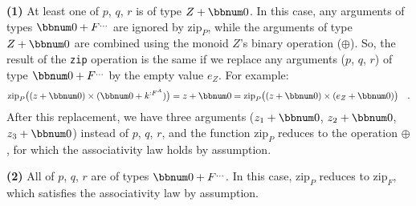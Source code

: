 \textbf{(1)} At least one of $p$, $q$, $r$ is of type $Z+\bbnum 0$.
In this case, any arguments of types $\bbnum 0+F^{...}$ are ignored
by $\text{zip}_{P}$, while the arguments of type $Z+\bbnum 0$ are
combined using the monoid $Z$\textsf{'}s binary operation ($\oplus$). So,
the result of the \lstinline!zip! operation is the same if we replace
any arguments ($p$, $q$, $r$) of type $\bbnum 0+F^{...}$ by the
empty value $e_{Z}$. For example:
\[
\text{zip}_{P}\big((z+\bbnum 0)\times(\bbnum 0+k^{:F^{A}})\big)=z+\bbnum 0=\text{zip}_{P}\big((z+\bbnum 0)\times(e_{Z}+\bbnum 0)\big)\quad.
\]
After this replacement, we have three arguments ($z_{1}+\bbnum 0$,
$z_{2}+\bbnum 0$, $z_{3}+\bbnum 0$) instead of $p$, $q$, $r$,
and the function $\text{zip}_{P}$ reduces to the operation $\oplus$,
for which the associativity law holds by assumption.

\textbf{(2)} All of $p$, $q$, $r$ are of types $\bbnum 0+F^{...}$.
In this case, $\text{zip}_{P}$ reduces to $\text{zip}_{F}$, which
satisfies the associativity law by assumption.

